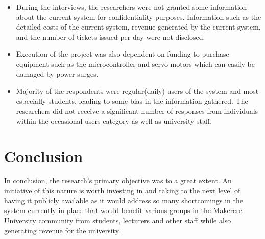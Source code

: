 \begin{itemize}
    \item During the interviews, the researchers were not granted some information about the current system for confidentiality purposes. Information such as the detailed costs of the current system, revenue generated by the current system, and the number of tickets issued per day were not disclosed.
    \item Execution of the project was also dependent on funding to purchase equipment such as the microcontroller and servo motors which can easily be damaged by power surges.
    \item Majority of the respondents were regular(daily) users of the system and most especially students, leading to some bias in the information gathered. The researchers did not receive a significant number of responses from individuals within the occasional users category as well as university staff.
\end{itemize}


\section{Conclusion}
In conclusion, the research's primary objective was to a great extent. An initiative of this nature is worth investing in and taking to the next level of having it publicly available as it would address so many shortcomings in the system currently in place that would benefit various groups in the Makerere University community from students, lecturers and other staff while also generating revenue for the university.


